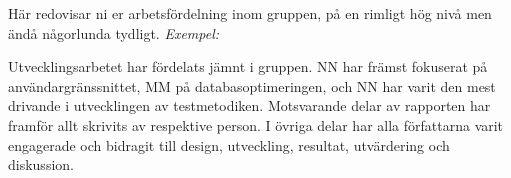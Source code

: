 Här redovisar ni er arbetsfördelning inom gruppen, på en rimligt hög nivå men ändå någorlunda tydligt. \emph{Exempel:}

Utvecklingsarbetet har fördelats jämnt i gruppen. NN har främst fokuserat på användar\-gräns\-snittet, MM på databasoptimeringen, och NN har varit den mest drivande i utvecklingen av testmetodiken. Motsvarande delar av rapporten har framför allt skrivits av respektive person. I övriga delar har alla författarna varit engagerade och bidragit till design, utveckling, resultat, utvärdering och diskussion.


